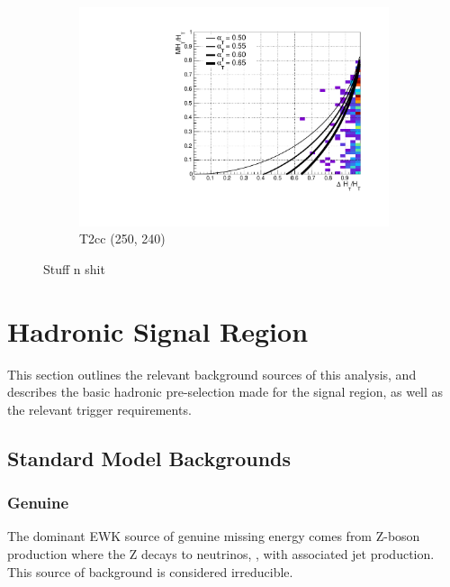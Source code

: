 \begin{figure}[h!]
\begin{subfigure}[b]{.46\textwidth}
    \caption{\zinv}
    \label{fig:alphat_corr_zinv}
  \end{subfigure}\\
  \begin{subfigure}[b]{.46\textwidth}
    \includegraphics[width=\textwidth]{Figs/alphat/alphat_correlation_T2cc_250_240.pdf}
    \caption{T2cc (250, 240)}
    \label{fig:alphat_corr_t2cc}
  \end{subfigure}
  \caption{Stuff n shit}
  \label{fig:alphat_corr}
\end{figure}



\section{Hadronic Signal Region}
\label{sec:selection_hadronic}

This section outlines the relevant background sources of this analysis, and
describes the basic hadronic pre-selection made for the signal 
region, as well as the relevant trigger requirements.


\subsection{Standard Model Backgrounds}
\subsubsection{Genuine \met}
The dominant EWK source of genuine missing energy comes from Z-boson 
production where the Z decays
to neutrinos, \zinv, with associated jet production. This source of background
is considered irreducible.


